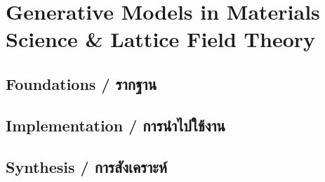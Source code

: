 \chapter{Generative Models in Materials Science \& Lattice Field Theory}
\label{ch:generative_models}

\section{Foundations \quad / \quad \textthai{รากฐาน}}



\section{Implementation \quad / \quad \textthai{การนำไปใช้งาน}}



\section{Synthesis \quad / \quad \textthai{การสังเคราะห์}}



